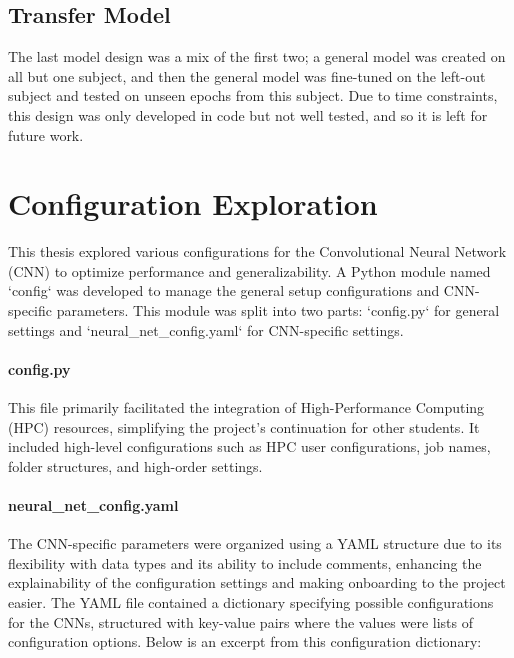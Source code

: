 \subsection{Transfer Model}
The last model design was a mix of the first two; a general model was created on all but one subject, and then the general model was fine-tuned on the left-out subject and tested on unseen epochs from this subject. Due to time constraints, this design was only developed in code but not well tested, and so it is left for future work. 

\section{Configuration Exploration}
This thesis explored various configurations for the Convolutional Neural Network (CNN) to optimize performance and generalizability. A Python module named `config` was developed to manage the general setup configurations and CNN-specific parameters. This module was split into two parts: `config.py` for general settings and `neural\_net\_config.yaml` for CNN-specific settings.

\paragraph{config.py}
This file primarily facilitated the integration of High-Performance Computing (HPC) resources, simplifying the project's continuation for other students. It included high-level configurations such as HPC user configurations, job names, folder structures, and high-order settings.

\paragraph{neural\_net\_config.yaml}
The CNN-specific parameters were organized using a YAML structure due to its flexibility with data types and its ability to include comments, enhancing the explainability of the configuration settings and making onboarding to the project easier. The YAML file contained a dictionary specifying possible configurations for the CNNs, structured with key-value pairs where the values were lists of configuration options. Below is an excerpt from this configuration dictionary:

